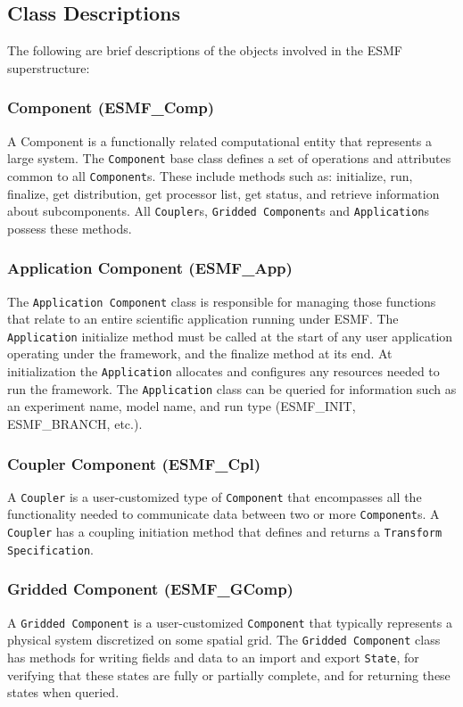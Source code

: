 \subsection{Class Descriptions}

The following are brief descriptions of the objects involved in the
ESMF superstructure:

\subsubsection{Component (ESMF\_Comp)} 
A Component is a functionally related computational entity that 
represents a large system.  The {\tt Component} base class defines a set of operations and
attributes common to all {\tt Component}s.  These include methods such as:
initialize, run, finalize, get distribution, get processor list, get status, 
and retrieve information about subcomponents.  
All {\tt Coupler}s, {\tt Gridded Component}s and {\tt Application}s possess 
these methods. 

\subsubsection{Application Component (ESMF\_App)}

The {\tt Application Component} class is responsible for managing those 
functions that relate to an entire scientific application running under ESMF.
The {\tt Application} initialize method 
must be called at the start of any user application operating under the framework, and
the finalize method at its end.  At initialization the {\tt Application} allocates and 
configures any resources needed to run the framework.  The {\tt Application}
class can be queried for information such as an experiment name, model name, and run 
type (ESMF\_INIT, ESMF\_BRANCH, etc.).  

\subsubsection{Coupler Component (ESMF\_Cpl)}
A {\tt Coupler} is a user-customized type of {\tt Component} that 
encompasses all the functionality needed to communicate data between two or 
more {\tt Component}s.  A {\tt Coupler} has a coupling initiation method that 
defines and returns a {\tt Transform Specification}.

\subsubsection{Gridded Component (ESMF\_GComp)}
\label{sec:griddedcomponent} 
A {\tt Gridded Component} is a user-customized {\tt Component} 
that typically represents a physical system discretized on some spatial grid.
The {\tt Gridded Component} class has methods for writing 
fields and data to an import and export {\tt State}, for verifying that
these states are fully or partially complete, and for returning these
states when queried.

